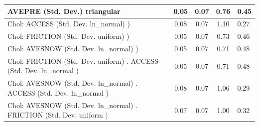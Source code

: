 \begin{table}
\begin{center}
\begin{tabular}{|l|l|c|c|c|l|}
			\hline
			AVEPRE (Std. Dev.) triangular &  & 0.05 & 0.07 & 0.76 & 0.45 \\
			\hline
			 Chol: ACCESS (Std. Dev. ln_normal) ) &  & 0.08 & 0.07 & 1.10 & 0.27 \\
			\hline
			 Chol: FRICTION (Std. Dev. uniform) ) &  & 0.05 & 0.07 & 0.73 & 0.46 \\
			\hline
			 Chol: AVESNOW (Std. Dev. ln_normal) ) &  & 0.05 & 0.07 & 0.71 & 0.48 \\
			\hline
			 Chol: FRICTION (Std. Dev. uniform) . ACCESS (Std. Dev.   ln_normal ) &  & 0.05 & 0.07 & 0.71 & 0.48 \\
			\hline
			 Chol: AVESNOW (Std. Dev. ln_normal) . ACCESS (Std. Dev.   ln_normal ) &  & 0.08 & 0.07 & 1.06 & 0.29 \\
			\hline
			 Chol: AVESNOW (Std. Dev. ln_normal) . FRICTION (Std. Dev.   uniform ) &  & 0.07 & 0.07 & 1.00 & 0.32 \\
			\hline
		\end{tabular}
	\end{center}
\end{table}